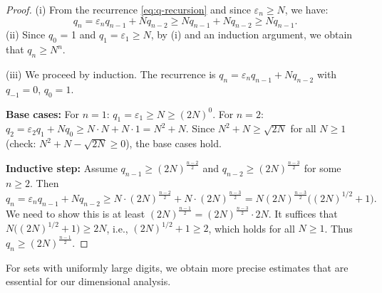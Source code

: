 \documentclass[12pt]{article}
\newtheorem{lemma}[theorem]{Lemma}
\numberwithin{equation}{section}
\begin{document}
\begin{proof}
(i) From the recurrence \eqref{eq:q-recursion} and since $\varepsilon_n \geq N$, we have:
\[
q_n = \varepsilon_n q_{n-1} + N q_{n-2} \geq N q_{n-1} + N q_{n-2} \ge N q_{n-1}.
\]
%
(ii) Since $q_0$ = 1 and $q_1 = \varepsilon_1 \geq N$, by (i) and an induction argument, we obtain that $q_n \geq N^n$. 
%

\noindent (iii) 
We proceed by induction. The recurrence is $q_n = \varepsilon_n q_{n-1} + N q_{n-2}$ with $q_{-1}=0$, $q_0=1$.

\noindent
\textbf{Base cases:}
For $n=1$: $q_1 = \varepsilon_1 \geq N {\ge} (2N)^{0}$.
For $n=2$: $q_2 = \varepsilon_2 q_1 + N q_0 \geq N \cdot N + N \cdot 1 = N^2 + N$.
Since $N^2 + N \geq \sqrt{2N}$ for all $N \geq 1$ (check: $N^2+N - \sqrt{2N} \geq 0$), the base cases hold.

\noindent
\textbf{Inductive step:} Assume $q_{n-1} \geq (2N)^{\frac{n-2}{2}}$ and $q_{n-2} \geq (2N)^{\frac{n-3}{2}}$ for some $n \geq 2$. Then
\[
q_n = \varepsilon_n q_{n-1} + N q_{n-2} 
    \geq N \cdot (2N)^{\frac{n-2}{2}} + N \cdot (2N)^{\frac{n-3}{2}}
    = N(2N)^{\frac{n-3}{2}}\bigl((2N)^{1/2} + 1\bigr).
\]
We need to show this is at least $(2N)^{\frac{n-1}{2}} = (2N)^{\frac{n-3}{2}} \cdot 2N$. 
It suffices that $N\bigl((2N)^{1/2} + 1\bigr) \geq 2N$, i.e., $(2N)^{1/2} + 1 \geq 2$, which holds for all $N \geq 1$. 
Thus $q_n \geq (2N)^{\frac{n-1}{2}}$.
\end{proof}

For sets with uniformly large digits, we obtain more precise estimates that are essential for our dimensional analysis.

 
 
 

\end{document}
